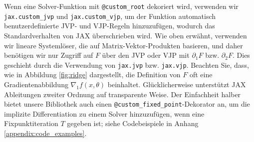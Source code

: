%
%

Wenn eine Solver-Funktion mit \texttt{@custom\_root} dekoriert wird, verwenden wir \texttt{jax.custom\_jvp} und \texttt{jax.custom\_vjp}, um der Funktion automatisch benutzerdefinierte JVP- und VJP-Regeln hinzuzufügen, wodurch das Standardverhalten von JAX überschrieben wird.
Wie oben erwähnt, verwenden wir lineare Systemlöser, die auf Matrix-Vektor-Produkten basieren, und daher benötigen wir nur Zugriff auf $F$ über den JVP oder VJP mit $\partial_1 F$ bzw. $\partial_2 F$. Dies geschieht durch die Verwendung von \texttt{jax.jvp} bzw. \texttt{jax.vjp}. Beachten Sie, dass, wie in Abbildung \ref{fig:ridge} dargestellt, die Definition von $F$ oft eine Gradientenabbildung $\nabla_1 f(x, \theta)$ beinhaltet.
Glücklicherweise unterstützt JAX Ableitungen zweiter Ordnung auf transparente Weise.  Der Einfachheit halber bietet unsere Bibliothek auch einen \texttt{@custom\_fixed\_point}-Dekorator an, um die implizite Differentiation zu einem Solver hinzuzufügen, wenn eine Fixpunktiteration $T$ gegeben ist; siehe Codebeispiele in Anhang \ref{appendix:code_examples}.  


